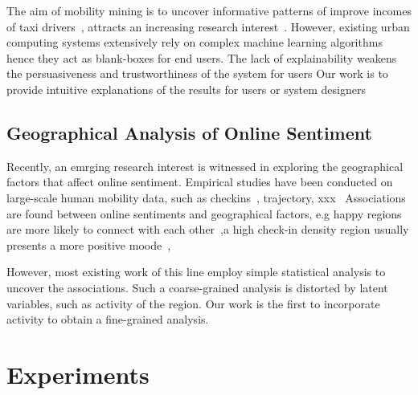 \documentclass[runningheads]{llncs}
\begin{document}
The aim of mobility mining is to uncover informative patterns of improve incomes of taxi drivers~\cite{}, attracts an increasing research interest~\cite{}. 
However, existing urban computing systems extensively rely on complex machine learning algorithms hence they act as blank-boxes for end users. 
The lack of explainability weakens the persuasiveness and trustworthiness of the system for users
Our work is to provide intuitive explanations of the results for users or system designers



\subsection{Geographical Analysis of Online Sentiment}

Recently, an emrging research interest is witnessed in exploring the geographical factors that affect online sentiment.
Empirical studies have been conducted on large-scale human mobility data, such as checkins~\cite{}, trajectory, xxx~\cite{}
Associations are found between online sentiments and geographical factors, e.g happy regions are more likely to connect with each other~\cite{milan15},a high check-in density region usually presents a more positive moode~\cite{}, 

However, most existing work of this line employ simple statistical analysis to uncover the associations. 
Such a coarse-grained analysis is distorted by latent variables, such as activity of the region.
Our work is the first to incorporate activity to obtain a fine-grained analysis.

\section{Experiments}
\end{document}
